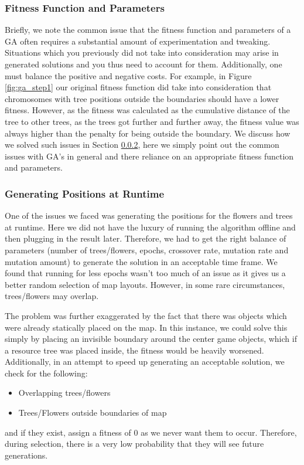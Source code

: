 \subsubsection{Fitness Function and Parameters}
Briefly, we note the common issue that the fitness function and parameters of a GA often requires a 
substantial amount of experimentation and tweaking. Situations which you 
previously did not take into consideration may arise in generated solutions and you thus need to account for 
them. Additionally, one must balance the positive and negative costs. For example, in Figure \ref{fig:ga_step1}
our original fitness function did take into consideration that chromosomes with tree positions outside the 
boundaries should have a lower fitness. However, as the fitness was calculated as the cumulative distance
of the tree to other trees, as the trees got further and further away, the fitness value was always higher
than the penalty for being outside the boundary. We discuss how we solved such issues in Section 
\ref{sec:runtimeIssues}, here we simply point out the common issues with GA's in general and there
reliance on an appropriate fitness function and parameters.

\subsubsection{Generating Positions at Runtime} \label{sec:runtimeIssues}
One of the issues we faced was generating the positions for the flowers and trees at runtime. Here we did not
have the luxury of running the algorithm offline and then plugging in the result later. Therefore,
we had to get the right balance of parameters (number of trees/flowers, epochs, crossover rate, mutation rate 
and mutation amount) to generate the solution in an acceptable time frame. We found that running for less epochs 
wasn't too much of an issue as it gives us a better random selection of map layouts. However, in some
rare circumstances, trees/flowers may overlap.

The problem was further exaggerated by the fact that there was objects which were already statically placed on 
the map. In this instance, we could solve this simply by placing an invisible boundary around the center
game objects, which if a resource tree was placed inside, the fitness would be heavily worsened. Additionally,
in an attempt to speed up generating an acceptable solution, we check for the following:
\begin{itemize}
\item Overlapping trees/flowers
\item Trees/Flowers outside boundaries of map
\end{itemize}
and if they exist, assign a fitness of 0 as we never want them to occur. Therefore, during selection, there is
a very low probability that they will see future generations.

